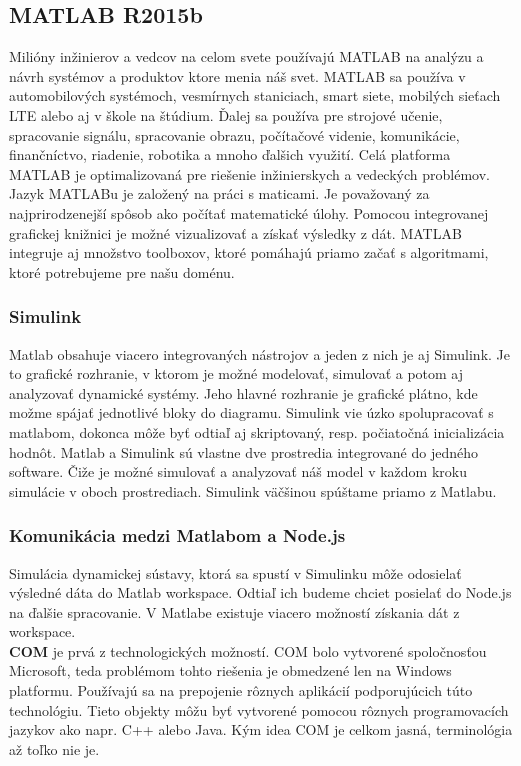 \subsection{MATLAB R2015b}
Milióny inžinierov a vedcov na celom svete používajú MATLAB na analýzu a návrh systémov a produktov ktore menia náš svet. MATLAB sa používa v automobilových systémoch, vesmírnych staniciach, smart siete, mobilých sieťach LTE alebo aj v škole na štúdium. Ďalej sa používa pre strojové učenie, spracovanie signálu, spracovanie obrazu, počítačové videnie, komunikácie, finančníctvo, riadenie, robotika a mnoho ďalšich využití.
Celá platforma MATLAB je optimalizovaná pre riešenie inžinierskych a vedeckých problémov. Jazyk MATLABu je založený na práci s maticami. Je považovaný za najprirodzenejší spôsob ako počítať matematické úlohy. Pomocou integrovanej grafickej knižnici je možné vizualizovať a získať výsledky z dát. MATLAB integruje aj množstvo toolboxov, ktoré pomáhajú priamo začať s algoritmami, ktoré potrebujeme pre našu doménu.\cite{matlab-mathworks}

\subsubsection{Simulink}
Matlab obsahuje viacero integrovaných nástrojov a jeden z nich je aj Simulink. Je to grafické rozhranie, v ktorom je možné modelovať, simulovať a potom aj analyzovať dynamické systémy. Jeho hlavné rozhranie je grafické plátno, kde možme spájať jednotlivé bloky do diagramu. Simulink vie úzko spolupracovať s matlabom, dokonca môže byť odtiaľ aj skriptovaný, resp. počiatočná inicializácia hodnôt. Matlab a Simulink sú vlastne dve prostredia integrované do jedného software. Čiže je možné simulovať a analyzovať náš model v každom kroku simulácie v oboch prostrediach. Simulink väčšinou spúštame priamo z Matlabu.

\subsubsection{Komunikácia medzi Matlabom a Node.js}
Simulácia dynamickej sústavy, ktorá sa spustí v Simulinku môže odosielať výsledné dáta do Matlab workspace. Odtiaľ ich budeme chciet posielať do Node.js na ďalšie spracovanie. V Matlabe existuje viacero možností získania dát z workspace.\\

\textbf{COM} je prvá z technologických možností. COM bolo vytvorené spoločnosťou Microsoft, teda problémom tohto riešenia je obmedzené len na Windows platformu. Používajú sa na prepojenie rôznych aplikácií podporujúcich túto technológiu. Tieto objekty môžu byť vytvorené pomocou rôznych programovacích jazykov ako napr. C++ alebo Java.\cite{matlab-microsoft-com}
Kým idea COM je celkom jasná, terminológia až toľko nie je.

